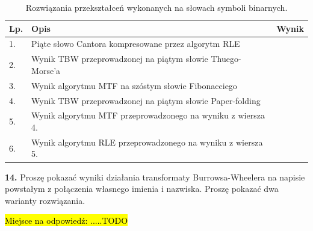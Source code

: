 \documentclass[twoside]{article}
\begin{document}
\begin{table}[ht!]
\begin{tabular}{|l|l|l|}
\hline
\multicolumn{1}{|r|}{Lp.} & Opis                                                        & Wynik \\ \hline
1.                        & Piąte słowo Cantora kompresowane przez algorytm RLE         &       \\ \hline
2.                        & Wynik TBW przeprowadzonej na piątym słowie Thuego-Morse'a   &       \\ \hline
3.                        & Wynik algorytmu MTF na szóstym słowie Fibonacciego          &       \\ \hline
4.                        & Wynik TBW przeprowadzonej na piątym słowie Paper-folding    &       \\ \hline
5.                        & Wynik algorytmu MTF przeprowadzonego na wyniku z wiersza 4. &       \\ \hline
6.                        & Wynik algorytmu RLE przeprowadzonego na wyniku z wiersza 5. &       \\ \hline
\end{tabular}
\caption{Rozwiązania przekształceń wykonanych na słowach symboli binarnych.}
\label{table:words-transform-results}
\end{table}

\textbf{14.}
Proszę pokazać wyniki działania transformaty Burrowsa-Wheelera na napisie powstałym z połączenia własnego 
imienia i nazwiska. 
Proszę pokazać dwa warianty rozwiązania.
\newline

\hl{Miejsce na odpowiedź: .....TODO}
\end{document}

